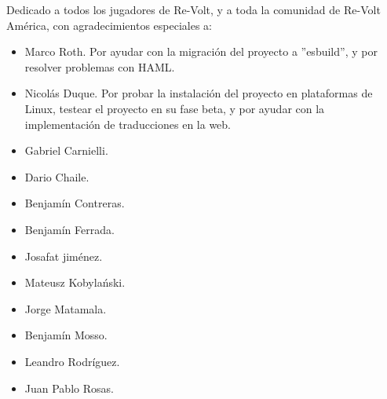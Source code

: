 Dedicado a todos los jugadores de Re-Volt, y a toda la comunidad de Re-Volt América, con agradecimientos especiales a:

\begin{itemize}
	\item Marco Roth. Por ayudar con la migración del proyecto a ''esbuild'', y por resolver problemas con HAML.
	\item Nicolás Duque. Por probar la instalación del proyecto en plataformas de Linux, testear el proyecto en su fase beta, y por ayudar con la implementación de traducciones en la web.
\end{itemize}

\begin{itemize}
	\item Gabriel Carnielli.
	\item Dario Chaile.
	\item Benjamín Contreras.
	\item Benjamín Ferrada.
	\item Josafat jiménez.
	\item  Mateusz Kobylański.
	\item Jorge Matamala.
	\item Benjamín Mosso.
	\item Leandro Rodríguez.
	\item Juan Pablo Rosas.
\end{itemize}
